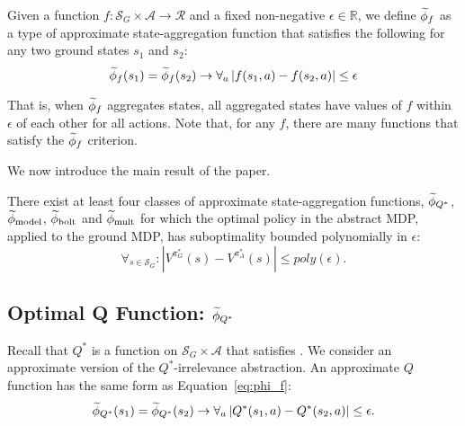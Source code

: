 \begin{defn}
Given a function $f: \mathcal{S}_G \times \mathcal{A} \rightarrow \mathcal{R}$ and a fixed non-negative $\epsilon \in \mathbb{R}$, we define $\widetilde \phi_f$ as a type of approximate state-aggregation function that satisfies the following for any two ground states $s_1$ and $s_2$: 
\begin{equation}
\label{eq:phi_f}
\widetilde \phi_f(s_1) = \widetilde \phi_f(s_2) \rightarrow \forall_a \left|f(s_1, a) - f(s_2, a)\right| \leq \epsilon
\end{equation}
\end{defn}

That is, when $\widetilde \phi_f$ aggregates states, all aggregated states have values of $f$ within $\epsilon$ of each other for all actions. Note that, for any $f$, there are many functions that satisfy the $\widetilde \phi_f$ criterion.

We now introduce the main result of the paper.

\begin{thm}
There exist at least four classes of approximate state-aggregation functions, $\widetilde \phi_{Q^*}$, $\widetilde \phi_{\text{model}}$, $\widetilde \phi_{\text{bolt}}$ and $\widetilde \phi_{\text{mult}}$ for which the optimal policy in the abstract \ac{MDP}, applied to the ground \ac{MDP}, has suboptimality bounded polynomially in $\epsilon$:
\begin{equation}
\forall_{s \in \mathcal{S}_G}: | V^{\pi^*_G}(s) - V^{\pi^*_{A}}(s) | \leq poly(\epsilon).
\end{equation}
\end{thm}


\subsection{Optimal Q Function: $\widetilde \phi_{Q^*}$}
\label{sec:Q*}

Recall that $Q^*$ is a function on $\mathcal{S}_G \times \mathcal{A}$ that satisfies . We consider an approximate version of the $Q^*$-irrelevance abstraction. An approximate $Q$ function has the same form as Equation~\ref{eq:phi_f}:
\begin{equation}
\widetilde \phi_{Q^*}(s_1) = \widetilde \phi_{Q^*}(s_2) \rightarrow \forall_a \left|Q^*(s_1, a) - Q^*(s_2, a)\right| \leq \epsilon.
\end{equation}

